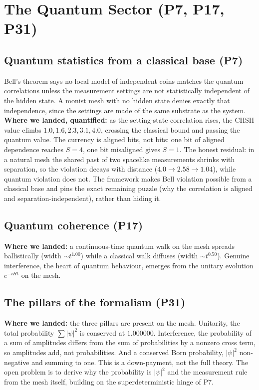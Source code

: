 \section{The Quantum Sector (P7, P17, P31)}
\label{sec:quantum}

\subsection{Quantum statistics from a classical base (P7)}

Bell's theorem says no local model of independent coins matches the quantum
correlations unless the measurement settings are not statistically independent of the
hidden state. A monist mesh with no hidden state denies exactly that independence, since
the settings are made of the same substrate as the system. \textbf{Where we landed,
quantified:} as the setting-state correlation rises, the CHSH value climbs $1.0, 1.6,
2.3, 3.1, 4.0$, crossing the classical bound and passing the quantum value. The currency
is aligned bits, not bits: one bit of aligned dependence reaches $S=4$, one bit
misaligned gives $S=1$. The honest residual: in a natural mesh the shared past of two
spacelike measurements shrinks with separation, so the violation decays with distance
($4.0 \to 2.58 \to 1.04$), while quantum violation does not. The framework makes Bell
violation possible from a classical base and pins the exact remaining puzzle (why the
correlation is aligned and separation-independent), rather than hiding it.

\subsection{Quantum coherence (P17)}

\textbf{Where we landed:} a continuous-time quantum walk on the mesh spreads
ballistically (width $\sim t^{1.00}$) while a classical walk diffuses (width $\sim
t^{0.50}$). Genuine interference, the heart of quantum behaviour, emerges from the
unitary evolution $e^{-iHt}$ on the mesh.

\subsection{The pillars of the formalism (P31)}

\textbf{Where we landed:} the three pillars are present on the mesh. Unitarity, the
total probability $\sum|\psi|^2$ is conserved at $1.000000$. Interference, the
probability of a sum of amplitudes differs from the sum of probabilities by a nonzero
cross term, so amplitudes add, not probabilities. And a conserved Born probability,
$|\psi|^2$ non-negative and summing to one. This is a down-payment, not the full theory.
The open problem is to derive why the probability is $|\psi|^2$ and the measurement rule
from the mesh itself, building on the superdeterministic hinge of P7.
